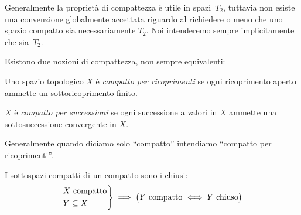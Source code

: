 
Generalmente la proprietà di compattezza è utile in spazi~$T_2$,
tuttavia non esiste una convenzione globalmente accettata
riguardo al richiedere o meno che uno spazio compatto sia necessariamente $T_2$.
Noi intenderemo sempre implicitamente che sia~$T_2$.

Esistono due nozioni di compattezza, non sempre equivalenti:

\begin{defn}
	Uno spazio topologico $X$ è \emph{compatto per ricoprimenti}
	se ogni ricoprimento aperto ammette un sottoricoprimento finito.
\end{defn}

\begin{defn}
	$X$ è \emph{compatto per successioni}
	se ogni successione a valori in $X$ ammette una sottosuccessione convergente in $X$.
\end{defn}

Generalmente quando diciamo solo ``compatto'' intendiamo ``compatto per ricoprimenti''.

\begin{prop}
	I sottospazi compatti di un compatto sono i chiusi:
	\[\begin{rcases}
		\text{$X$ compatto} \\
		Y\subseteq X
	\end{rcases}\implies
	\big(\text{$Y$ compatto $\iff Y$ chiuso}\big)\]
\end{prop}

